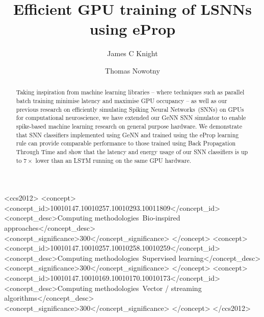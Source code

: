 \documentclass[sigconf]{acmart}
\begin{document}
\title{Efficient GPU training of LSNNs using eProp}

\author{James C Knight}

\author{Thomas Nowotny}
\renewcommand{\shortauthors}{Knight and Nowotny}

\begin{abstract}
    Taking inspiration from machine learning libraries -- where techniques such as parallel batch training minimise latency and maximise GPU occupancy -- as well as our previous research on efficiently simulating Spiking Neural Networks~(SNNs) on GPUs for computational neuroscience, we have extended our GeNN SNN simulator to enable spike-based machine learning research on general purpose hardware.
    We demonstrate that SNN classifiers implemented using GeNN and trained using the eProp learning rule can provide comparable performance to those trained using Back Propagation Through Time and show that the latency and energy usage of our SNN classifiers is up to $7\times$ lower than an LSTM running on the same GPU hardware.
\end{abstract}

\begin{CCSXML}
<ccs2012>
   <concept>
       <concept_id>10010147.10010257.10010293.10011809</concept_id>
       <concept_desc>Computing methodologies~Bio-inspired approaches</concept_desc>
       <concept_significance>300</concept_significance>
       </concept>
   <concept>
       <concept_id>10010147.10010257.10010258.10010259</concept_id>
       <concept_desc>Computing methodologies~Supervised learning</concept_desc>
       <concept_significance>300</concept_significance>
       </concept>
   <concept>
       <concept_id>10010147.10010169.10010170.10010173</concept_id>
       <concept_desc>Computing methodologies~Vector / streaming algorithms</concept_desc>
       <concept_significance>300</concept_significance>
       </concept>
 </ccs2012>
\end{CCSXML}
\end{document}

